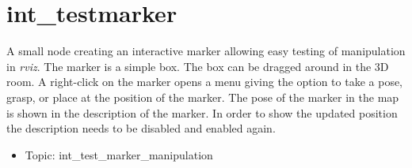 \documentclass[main.tex]{subfiles}
\begin{document}
			 
			\section{int\_testmarker}
			A small node creating an interactive marker allowing easy testing of manipulation in \textit{rviz}. The marker is a simple box. The box can be dragged around in the 3D room. A right-click on the marker opens a menu giving the option to take a pose, grasp, or place at the position of the marker. The pose of the marker in the map is shown in the description of the marker. In order to show the updated position the description needs to be disabled and enabled again.
			\begin{itemize}
				\item Topic: int\_test\_marker\_manipulation
			\end{itemize}

			
	\endgroup
\end{document}
